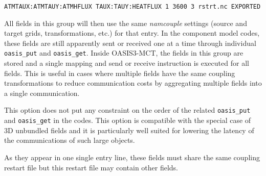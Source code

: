 {\tt ATMTAUX:ATMTAUY:ATMHFLUX  TAUX:TAUY:HEATFLUX 1 3600 3 rstrt.nc EXPORTED}

All fields in this group will then use the same
{\it namcouple} settings (source and target grids, transformations, etc.) for that entry.
In the component model codes,
these fields are still apparently sent or received one at a
time through individual {\tt oasis\_put} and {\tt oasis\_get}. Inside OASIS3-MCT, the fields in this group are stored and a single mapping
and send or receive instruction is executed for all fields. This is
useful in cases where multiple fields have the same coupling
transformations to reduce communication costs by aggregating multiple
fields into a single communication.

This option does not put any constraint
on the order of the related {\tt oasis\_put} and {\tt oasis\_get} in the codes.
This option is compatible with the special case of 3D unbundled fields
and it is particularly well suited for lowering the latency of the
communications of such large objects.

As they appear in one single entry line, these fields must share the same coupling restart file
but this restart file may contain other fields.

